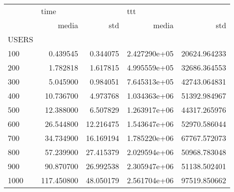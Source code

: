 \begin{tabular}{lrrrr}
\toprule
{} & \multicolumn{2}{l}{time} & \multicolumn{2}{l}{ttt} \\
{} &       media &        std &         media &           std \\
USERS &             &            &               &               \\
\midrule
100   &    0.439545 &   0.344075 &  2.427290e+05 &  20624.964233 \\
200   &    1.782818 &   1.617815 &  4.995559e+05 &  32686.364553 \\
300   &    5.045900 &   0.984051 &  7.645313e+05 &  42743.064831 \\
400   &   10.736700 &   4.973768 &  1.034363e+06 &  51392.984967 \\
500   &   12.388000 &   6.507829 &  1.263917e+06 &  44317.265976 \\
600   &   26.544800 &  12.216475 &  1.543647e+06 &  52970.586044 \\
700   &   34.734900 &  16.169194 &  1.785220e+06 &  67767.572073 \\
800   &   57.239900 &  27.415379 &  2.029594e+06 &  50968.783048 \\
900   &   90.870700 &  26.992538 &  2.305947e+06 &  51138.502401 \\
1000  &  117.450800 &  48.050179 &  2.561704e+06 &  97519.850662 \\
\bottomrule
\end{tabular}
